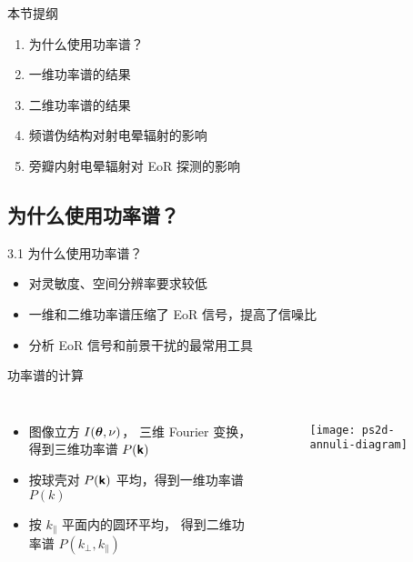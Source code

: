 \documentclass{beamer}
\begin{document}
\begin{frame}
  \begin{block}{本节提纲}
  \begin{enumerate}
    \item 为什么使用功率谱？
    \item 一维功率谱的结果
    \item 二维功率谱的结果
    \item 频谱伪结构对射电晕辐射的影响
    \item 旁瓣内射电晕辐射对 EoR 探测的影响
  \end{enumerate}
  \end{block}
\end{frame}

\subsection{为什么使用功率谱？}

\begin{frame}{3.1 为什么使用功率谱？}
  \begin{itemize}
    \item 对灵敏度、空间分辨率要求较低
    \item 一维和二维功率谱压缩了 EoR 信号，提高了信噪比
    \item 分析 EoR 信号和前景干扰的最常用工具
  \end{itemize}
\end{frame}

\begin{frame}[t]
  \begin{alertblock}{功率谱的计算}
  \end{alertblock}
  \begin{columns}
    \begin{itemize}
      \item \alert{图像立方} $I(\bm{\mathsf{\theta}}, \nu)$，
        三维 Fourier 变换，得到\alert{三维功率谱} $P(\bm{\mathsf{k}})$
      \item 按球壳对 $P(\bm{\mathsf{k}})$ 平均，得到\alert{一维功率谱} $P(k)$
      \item 按 $k_{\parallel}$ 平面内的圆环平均，
        得到\alert{二维功率谱} $P(k_{\perp}, k_{\parallel})$
    \end{itemize}

    \begin{figure}
      \centering
      \texttt{[image: ps2d-annuli-diagram]}
    \end{figure}
  \end{columns}
\end{frame}
\end{document}
